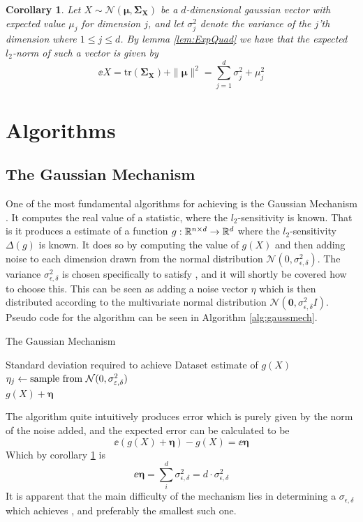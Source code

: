 \documentclass[a4paper,12pt]{article}
\newcommand{\Desc}[2]{\State \makebox[6em][l]{#1}#2}
\newtheorem{corollary}{Corollary}[section]
\begin{document}
\begin{corollary}
\label{cor:expNorm}
Let $X \sim \mathcal{N}(\bm{\mu}, \bm{\Sigma_X})$ be a $d$-dimensional gaussian vector
with expected value $\mu_j$ for dimension $j$, and let $\sigma_j^2$ denote the variance of the 
$j$'th dimension where $1 \le j \le d$.
By lemma \ref{lem:ExpQuad} we have that the expected $l_2$-norm 
of such a vector is given by
\[
    \ee{X} = \text{tr} (\bm{\Sigma_X}) + \|\bm{\mu}\|^2 = \sum_{j=1}^d \sigma_j^2 + \mu_j^2
\]
\end{corollary}


\section{Algorithms}
\subsection{The Gaussian Mechanism}
One of the most fundamental algorithms for achieving 
\edp is the Gaussian Mechanism \cite{dpbasic}. It computes the real
value of a statistic, where the $l_2$-sensitivity is known.
That is it produces a \edp estimate of a function 
$g: \R^{n \times d} \rightarrow \R^{d}$ where the $l_2$-sensitivity $ \Delta(g) $ 
is known.
It does so by computing the value of $g(X)$ and then adding noise
to each dimension drawn from the normal distribution 
$\mathcal{N}(0, \sigma_{\epsilon,\delta}^2)$.
The variance $\sigma_{\epsilon, \delta}^2$ is chosen specifically to satisfy \edp, 
and it will shortly be covered how to choose this.
This can be seen as adding a noise vector $\eta$ which 
is then distributed according to
the multivariate normal distribution 
$\mathcal{N}(\bm{0}, \sigma_{\epsilon,\delta}^2I)$. 
Pseudo code for the algorithm can be seen in Algorithm \ref{alg:gaussmech}.

\begin{algorithm}
\caption{The Gaussian Mechanism}\label{alg:gaussmech}
\begin{algorithmic}
    \Input
    \Desc{$\sigma_{\epsilon,\delta}$}{Standard deviation required to achieve \edp}
    \Desc{$X \in \R^{n \times d}$}{Dataset}
    \EndInput
    \Output
    \State\edp estimate of $g(X)$
    \EndOutput
        \State$\eta_j \gets \textnormal{sample from } \mathcal{N}(0, \sigma_{\epsilon,\delta}^2)$
    \EndFor \\
    \Return$g(X) + \bm{\eta}$
\end{algorithmic}
\end{algorithm}
\noindent The algorithm quite intuitively produces error which is purely given by the norm of the noise added, and the expected error can be calculated to be
\[
    \ee{(g(X) + \bm{\eta}) - g(X)} = 
    \ee{\bm{\eta}}
\]
Which by corollary \ref{cor:expNorm} is 
\begin{equation}
\label{eq:ExpErrGM}
    \ee{\bm{\eta}} = \sum_i^d \sigma_{\epsilon,\delta}^2 = d \cdot \sigma_{\epsilon,\delta}^2
\end{equation}
It is apparent that the main difficulty of the mechanism 
lies in determining a $\sigma_{\epsilon, \delta}$ which achieves
\edp, and preferably the smallest such one.
\end{document}
